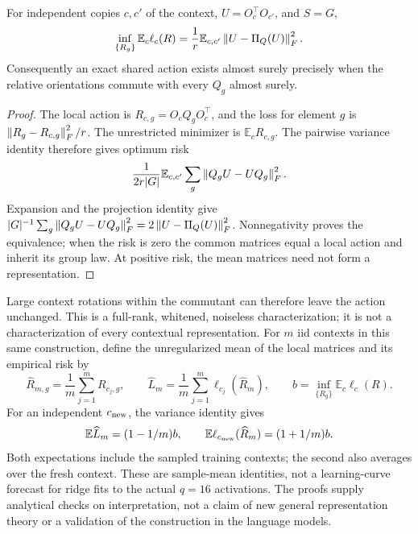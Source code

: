 \begin{proposition}
\label{prop:commutant}
For independent copies $c,c'$ of the context, $U=O_c^\top O_{c'}$, and $S=G$,
\[
 \inf_{\{R_g\}}\mathbb E_c\ell_c(R)
 =\frac1r\mathbb E_{c,c'}\left\lVert U-\Pi_Q(U)\right\rVert_F^2.
\]
Consequently an exact shared action exists almost surely precisely when the relative orientations commute with every $Q_g$ almost surely.
\end{proposition}
\begin{proof}
The local action is $R_{c,g}=O_cQ_gO_c^\top$, and the loss for element $g$ is $\left\lVert R_g-R_{c,g}\right\rVert_F^2/r$. The unrestricted minimizer is $\mathbb E_cR_{c,g}$. The pairwise variance identity therefore gives optimum risk
\[
 \frac1{2r|G|}\mathbb E_{c,c'}\sum_g\left\lVert Q_gU-UQ_g\right\rVert_F^2.
\]
Expansion and the projection identity give $|G|^{-1}\sum_g\left\lVert Q_gU-UQ_g\right\rVert_F^2=2\left\lVert U-\Pi_Q(U)\right\rVert_F^2$. Nonnegativity proves the equivalence; when the risk is zero the common matrices equal a local action and inherit its group law. At positive risk, the mean matrices need not form a representation.
\end{proof}
Large context rotations within the commutant can therefore leave the action unchanged. This is a full-rank, whitened, noiseless characterization; it is not a characterization of every contextual representation. For $m$ iid contexts in this same construction, define the unregularized mean of the local matrices and its empirical risk by
\[
 \widehat R_{m,g}=\frac1m\sum_{j=1}^mR_{c_j,g},\qquad
 \widehat L_m=\frac1m\sum_{j=1}^m\ell_{c_j}(\widehat R_m),\qquad
 b=\inf_{\{R_g\}}\mathbb E_c\ell_c(R).
\]
For an independent $c_{\rm new}$, the variance identity gives
\[
 \mathbb E\widehat L_m=(1-1/m)b,\qquad
 \mathbb E\ell_{c_{\rm new}}(\widehat R_m)=(1+1/m)b.
\]
Both expectations include the sampled training contexts; the second also averages over the fresh context. These are sample-mean identities, not a learning-curve forecast for ridge fits to the actual $q=16$ activations. The proofs supply analytical checks on interpretation, not a claim of new general representation theory or a validation of the construction in the language models.

